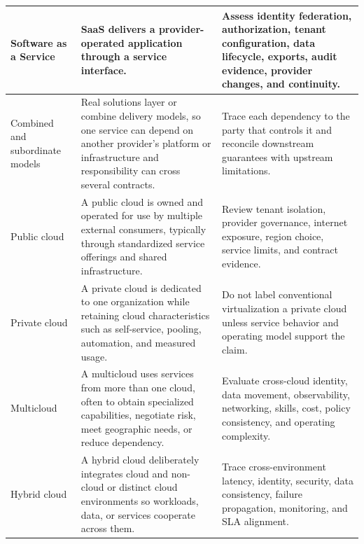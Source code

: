 \documentclass[11pt]{article}
\begin{document}
\begin{longtable}{@{}>{\RaggedRight\arraybackslash}p{}>{\RaggedRight\arraybackslash}p{}>{\RaggedRight\arraybackslash}p{}@{}}
Software as a Service & SaaS delivers a provider-operated application through a service interface. & Assess identity federation, authorization, tenant configuration, data lifecycle, exports, audit evidence, provider changes, and continuity. \\\midrule
Combined and subordinate models & Real solutions layer or combine delivery models, so one service can depend on another provider's platform or infrastructure and responsibility can cross several contracts. & Trace each dependency to the party that controls it and reconcile downstream guarantees with upstream limitations. \\\midrule
Public cloud & A public cloud is owned and operated for use by multiple external consumers, typically through standardized service offerings and shared infrastructure. & Review tenant isolation, provider governance, internet exposure, region choice, service limits, and contract evidence. \\\midrule
Private cloud & A private cloud is dedicated to one organization while retaining cloud characteristics such as self-service, pooling, automation, and measured usage. & Do not label conventional virtualization a private cloud unless service behavior and operating model support the claim. \\\midrule
Multicloud & A multicloud uses services from more than one cloud, often to obtain specialized capabilities, negotiate risk, meet geographic needs, or reduce dependency. & Evaluate cross-cloud identity, data movement, observability, networking, skills, cost, policy consistency, and operating complexity. \\\midrule
Hybrid cloud & A hybrid cloud deliberately integrates cloud and non-cloud or distinct cloud environments so workloads, data, or services cooperate across them. & Trace cross-environment latency, identity, security, data consistency, failure propagation, monitoring, and SLA alignment. \\\midrule
\bottomrule
\end{longtable}
\endgroup
\end{document}
